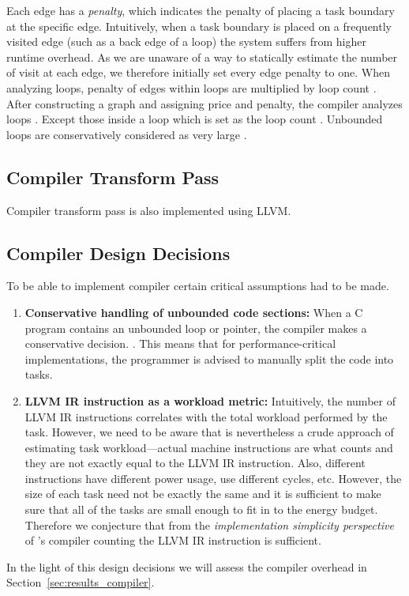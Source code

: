 Each edge has a {\em penalty}, which indicates the penalty of placing a task boundary at the specific edge. Intuitively, when a task boundary is placed on a frequently visited edge (such as a back edge of a loop) the system suffers from higher runtime overhead. As we are unaware of a way to statically estimate the number of visit at each edge, we therefore initially set every edge penalty to one. When analyzing loops, penalty of edges within loops are multiplied by loop count . After constructing a graph and assigning price and penalty, the compiler analyzes loops . Except those inside a loop which is set as the loop count . Unbounded loops are conservatively considered as very large .

\subsection{Compiler Transform Pass}
\label{sec:compiler_transform_pass}

Compiler transform pass is also implemented using LLVM. 

\subsection{Compiler Design Decisions}
\label{sec:compiler_limitations}

To be able to implement \sys compiler certain critical assumptions had to be made. 

\begin{enumerate}
	\item \textbf{Conservative handling of unbounded code sections:} When a C program contains an unbounded loop or pointer, the \sys compiler makes a conservative decision. . This means that for performance-critical implementations, the programmer is advised to manually split the code into tasks.
	\item \textbf{LLVM IR instruction as a workload metric:} Intuitively, the number of LLVM IR instructions correlates with the total workload performed by the task. However, we need to be aware that is nevertheless a crude approach of estimating task workload---actual machine instructions are what counts and they are not exactly equal to the LLVM IR instruction. Also, different instructions have different power usage, use different cycles, etc. However, the size of each task need not be exactly the same and it is sufficient to make sure that all of the tasks are small enough to fit in to the energy budget. Therefore we conjecture that from the \emph{implementation simplicity perspective} of \sys's compiler counting the LLVM IR instruction is sufficient.
\end{enumerate}

In the light of this design decisions we will assess the compiler overhead in Section~\ref{sec:results_compiler}.